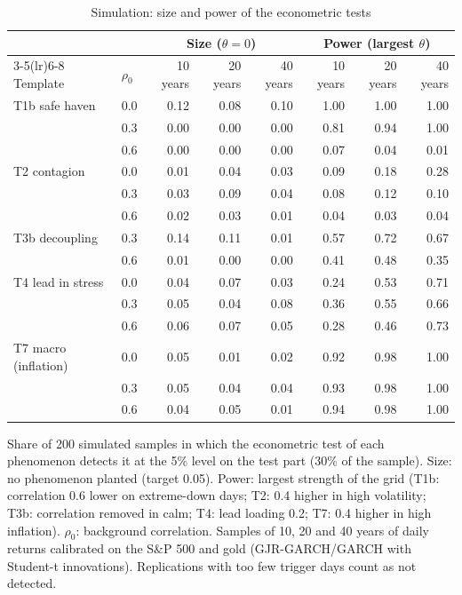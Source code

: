 \begin{table}[t]
\centering
\scriptsize
\setlength{\tabcolsep}{3pt}
\caption{Simulation: size and power of the econometric tests}
\label{tab:sim_econ}
\begin{tabular}{llrrrrrr}
\toprule
 & & \multicolumn{3}{c}{Size ($\theta = 0$)} & \multicolumn{3}{c}{Power (largest $\theta$)} \\
\cmidrule(lr){3-5}\cmidrule(lr){6-8}
Template & $\rho_0$ & 10 years & 20 years & 40 years & 10 years & 20 years & 40 years \\
\midrule
T1b safe haven & 0.0 & 0.12 & 0.08 & 0.10 & 1.00 & 1.00 & 1.00 \\
 & 0.3 & 0.00 & 0.00 & 0.00 & 0.81 & 0.94 & 1.00 \\
 & 0.6 & 0.00 & 0.00 & 0.00 & 0.07 & 0.04 & 0.01 \\
T2 contagion & 0.0 & 0.01 & 0.04 & 0.03 & 0.09 & 0.18 & 0.28 \\
 & 0.3 & 0.03 & 0.09 & 0.04 & 0.08 & 0.12 & 0.10 \\
 & 0.6 & 0.02 & 0.03 & 0.01 & 0.04 & 0.03 & 0.04 \\
T3b decoupling & 0.3 & 0.14 & 0.11 & 0.01 & 0.57 & 0.72 & 0.67 \\
 & 0.6 & 0.01 & 0.00 & 0.00 & 0.41 & 0.48 & 0.35 \\
T4 lead in stress & 0.0 & 0.04 & 0.07 & 0.03 & 0.24 & 0.53 & 0.71 \\
 & 0.3 & 0.05 & 0.04 & 0.08 & 0.36 & 0.55 & 0.66 \\
 & 0.6 & 0.06 & 0.07 & 0.05 & 0.28 & 0.46 & 0.73 \\
T7 macro (inflation) & 0.0 & 0.05 & 0.01 & 0.02 & 0.92 & 0.98 & 1.00 \\
 & 0.3 & 0.05 & 0.04 & 0.04 & 0.93 & 0.98 & 1.00 \\
 & 0.6 & 0.04 & 0.05 & 0.01 & 0.94 & 0.98 & 1.00 \\
\bottomrule
\end{tabular}
\par\smallskip
\parbox{\linewidth}{\footnotesize Share of 200 simulated samples in which the econometric test of each phenomenon detects it at the 5\% level on the test part (30\% of the sample). Size: no phenomenon planted (target 0.05). Power: largest strength of the grid (T1b: correlation 0.6 lower on extreme-down days; T2: 0.4 higher in high volatility; T3b: correlation removed in calm; T4: lead loading 0.2; T7: 0.4 higher in high inflation). $\rho_0$: background correlation. Samples of 10, 20 and 40 years of daily returns calibrated on the S\&P 500 and gold (GJR-GARCH/GARCH with Student-t innovations). Replications with too few trigger days count as not detected.}
\end{table}
